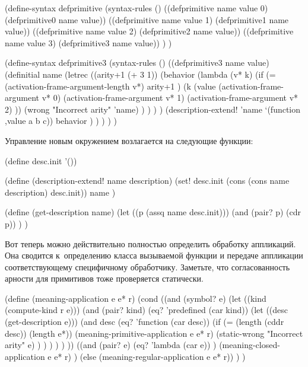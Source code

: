 \begin{code:lisp}
(define-syntax defprimitive
  (syntax-rules ()
    ((defprimitive name value 0) (defprimitive0 name value))
    ((defprimitive name value 1) (defprimitive1 name value))
    ((defprimitive name value 2) (defprimitive2 name value))
    ((defprimitive name value 3) (defprimitive3 name value)) ) )

(define-syntax defprimitive3
  (syntax-rules ()
    ((defprimitive3 name value)
     (definitial name
       (letrec ((arity+1 (+ 3 1))
                (behavior
                 (lambda (v* k)
                   (if (= (activation-frame-argument-length v*)
                          arity+1 )
                       (k (value (activation-frame-argument v* 0)
                                 (activation-frame-argument v* 1)
                                 (activation-frame-argument v* 2) ))
                       (wrong "Incorrect arity" 'name) ) ) ) )
         (description-extend!
          'name `(function ,value a b c))
         behavior ) ) ) ) )
\end{code:lisp}

Управление новым окружением возлагается на следующие функции:

\begin{code:lisp}
(define desc.init '())

(define (description-extend! name description)
  (set! desc.init (cons (cons name description) desc.init))
  name )

(define (get-description name)
  (let ((p (assq name desc.init)))
    (and (pair? p) (cdr p)) ) )
\end{code:lisp}

Вот теперь можно действительно полностью определить обработку аппликаций.
Она сводится к~определению класса вызываемой функции и передаче аппликации
соответствующему специфичному обработчику. Заметьте, что согласованность арности
для примитивов тоже проверяется статически.

\begin{code:lisp}
(define (meaning-application e e* r)
  (cond
   ((and (symbol? e)
         (let ((kind (compute-kind r e)))
           (and (pair? kind)
                (eq? 'predefined (car kind))
                (let ((desc (get-description e)))
                  (and desc
                       (eq? 'function (car desc))
                       (if (= (length (cddr desc)) (length e*))
                           (meaning-primitive-application e e* r)
                           (static-wrong "Incorrect arity" e) ) ) ) ) ) ))
   ((and (pair? e)
         (eq? 'lambda (car e)) )
    (meaning-closed-application e e* r) )
   (else (meaning-regular-application e e* r)) ) )
\end{code:lisp}

